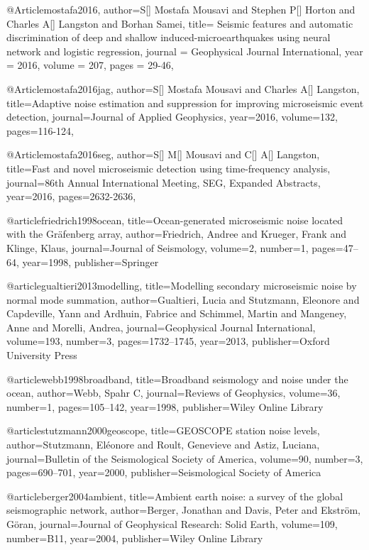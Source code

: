 @Article{mostafa2016,
  author={S[] Mostafa Mousavi and Stephen P[] Horton and Charles A[] Langston and Borhan Samei},
  title={ Seismic features and automatic discrimination of deep and shallow induced-microearthquakes using neural network and logistic regression},
  journal = 	 {Geophysical Journal International},
  year = 	 2016,
  volume =	 207,
  pages =	 {29-46},
}



@Article{mostafa2016jag,
  author={S[] Mostafa Mousavi and Charles A[] Langston},
  title={Adaptive noise estimation and suppression for improving microseismic event detection},
  journal={Journal of Applied Geophysics},
  year=2016,
  volume=132,
  pages={116-124},
}

  @Article{mostafa2016seg,
  author={S[] M[] Mousavi and C[] A[] Langston},
  title={Fast and novel microseismic detection using time-frequency analysis},
  journal={86th Annual International Meeting, SEG, Expanded Abstracts},
  year=2016,
  pages={2632-2636},
}

@article{friedrich1998ocean,
  title={Ocean-generated microseismic noise located with the Gr{\"a}fenberg array},
  author={Friedrich, Andree and Krueger, Frank and Klinge, Klaus},
  journal={Journal of Seismology},
  volume={2},
  number={1},
  pages={47--64},
  year={1998},
  publisher={Springer}
}

@article{gualtieri2013modelling,
  title={Modelling secondary microseismic noise by normal mode summation},
  author={Gualtieri, Lucia and Stutzmann, Eleonore and Capdeville, Yann and Ardhuin, Fabrice and Schimmel, Martin and Mangeney, Anne and Morelli, Andrea},
  journal={Geophysical Journal International},
  volume={193},
  number={3},
  pages={1732--1745},
  year={2013},
  publisher={Oxford University Press}
}

@article{webb1998broadband,
  title={Broadband seismology and noise under the ocean},
  author={Webb, Spahr C},
  journal={Reviews of Geophysics},
  volume={36},
  number={1},
  pages={105--142},
  year={1998},
  publisher={Wiley Online Library}
}

@article{stutzmann2000geoscope,
  title={GEOSCOPE station noise levels},
  author={Stutzmann, El{\'e}onore and Roult, Genevieve and Astiz, Luciana},
  journal={Bulletin of the Seismological Society of America},
  volume={90},
  number={3},
  pages={690--701},
  year={2000},
  publisher={Seismological Society of America}
}

@article{berger2004ambient,
  title={Ambient earth noise: a survey of the global seismographic network},
  author={Berger, Jonathan and Davis, Peter and Ekstr{\"o}m, G{\"o}ran},
  journal={Journal of Geophysical Research: Solid Earth},
  volume={109},
  number={B11},
  year={2004},
  publisher={Wiley Online Library}
}

